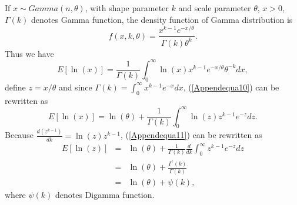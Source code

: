 \documentclass[12pt, draftclsnofoot, onecolumn]{IEEEtran}
\begin{document}
\section{}
If $x\sim Gamma(n, \theta)$, with shape parameter $k$ and scale parameter $\theta$, $x>0$, $\Gamma(k)$ denotes Gamma function, the density function of Gamma distribution is
\begin{equation}
f(x,k,\theta)=\frac{x^{k-1}e^{-x/\theta}}{\Gamma(k)\theta^{k}}.
\label{Appendequa9}
\end{equation}
Thus we have 
\begin{equation}
E[\ln(x)]=\frac{1}{\Gamma(k)}\int_{0}^{\infty}\ln(x)x^{k-1}e^{-x/\theta}\theta^{-k}dx,
\label{Appendequa10}
\end{equation}
define $z=x/\theta$ and since $\Gamma(k)=\int_{0}^{\infty}x^{k-1}e^{-x}dx$, (\ref{Appendequa10}) can be rewritten as
\begin{equation}
E[\ln(x)]=\ln(\theta)+\frac{1}{\Gamma(k)}\int_{0}^{\infty}\ln(z)z^{k-1}e^{-z}dz.
\label{Appendequa11}
\end{equation}
Because $\frac{d(z^{k-1})}{dk}=\ln(z)z^{k-1}$, (\ref{Appendequa11}) can be rewritten as
\begin{eqnarray}
\nonumber
E[\ln(z)]&=&\ln(\theta)+\frac{1}{\Gamma(k)}\frac{d}{dk}\int_{0}^{\infty}z^{k-1}e^{-z}dz\\
\nonumber
&=&\ln(\theta)+\frac{\Gamma^{'}(k)}{\Gamma(k)}\\
\nonumber
&=&\ln(\theta)+\psi(k),
\label{Appendequa12}
\end{eqnarray}
where $\psi(k)$ denotes Digamma function.
\end{document}
